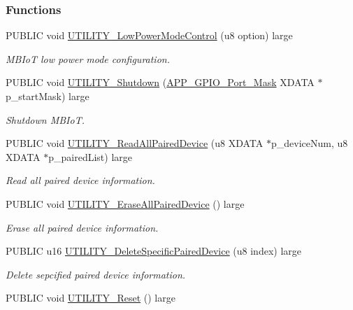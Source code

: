 \subsubsection*{Functions}
\begin{DoxyCompactItemize}
\item 
P\+U\+B\+L\+IC void \hyperlink{group___u_t_i_l_i_t_y_gaf56162eda7f62250b2e0ac04cc47103d}{U\+T\+I\+L\+I\+T\+Y\+\_\+\+Low\+Power\+Mode\+Control} (u8 option) large
\begin{DoxyCompactList}\small\item\em M\+B\+IoT low power mode configuration. \end{DoxyCompactList}\item 
P\+U\+B\+L\+IC void \hyperlink{group___u_t_i_l_i_t_y_ga4e5e4c7373ce431d4f79314a25e8368b}{U\+T\+I\+L\+I\+T\+Y\+\_\+\+Shutdown} (\hyperlink{struct_a_p_p___g_p_i_o___port___mask}{A\+P\+P\+\_\+\+G\+P\+I\+O\+\_\+\+Port\+\_\+\+Mask} X\+D\+A\+TA $\ast$p\+\_\+start\+Mask) large
\begin{DoxyCompactList}\small\item\em Shutdown M\+B\+IoT. \end{DoxyCompactList}\item 
P\+U\+B\+L\+IC void \hyperlink{group___u_t_i_l_i_t_y_gaa220e3a65ad055983746a496f5f091fc}{U\+T\+I\+L\+I\+T\+Y\+\_\+\+Read\+All\+Paired\+Device} (u8 X\+D\+A\+TA $\ast$p\+\_\+device\+Num, u8 X\+D\+A\+TA $\ast$p\+\_\+paired\+List) large
\begin{DoxyCompactList}\small\item\em Read all paired device information. \end{DoxyCompactList}\item 
P\+U\+B\+L\+IC void \hyperlink{group___u_t_i_l_i_t_y_gad4cc623d70e51882da4c77d2c4d81f9a}{U\+T\+I\+L\+I\+T\+Y\+\_\+\+Erase\+All\+Paired\+Device} () large\hypertarget{group___u_t_i_l_i_t_y_gad4cc623d70e51882da4c77d2c4d81f9a}{}\label{group___u_t_i_l_i_t_y_gad4cc623d70e51882da4c77d2c4d81f9a}

\begin{DoxyCompactList}\small\item\em Erase all paired device information. \end{DoxyCompactList}\item 
P\+U\+B\+L\+IC u16 \hyperlink{group___u_t_i_l_i_t_y_ga30652f81a214579ca0d01e8740492cee}{U\+T\+I\+L\+I\+T\+Y\+\_\+\+Delete\+Specific\+Paired\+Device} (u8 index) large
\begin{DoxyCompactList}\small\item\em Delete sepcified paired device information. \end{DoxyCompactList}\item 
P\+U\+B\+L\+IC void \hyperlink{group___u_t_i_l_i_t_y_gaeeed8ee65ce22ee218b8138a0326d0cc}{U\+T\+I\+L\+I\+T\+Y\+\_\+\+Reset} () large\hypertarget{group___u_t_i_l_i_t_y_gaeeed8ee65ce22ee218b8138a0326d0cc}{}\label{group___u_t_i_l_i_t_y_gaeeed8ee65ce22ee218b8138a0326d0cc}


\end{DoxyCompactItemize}

